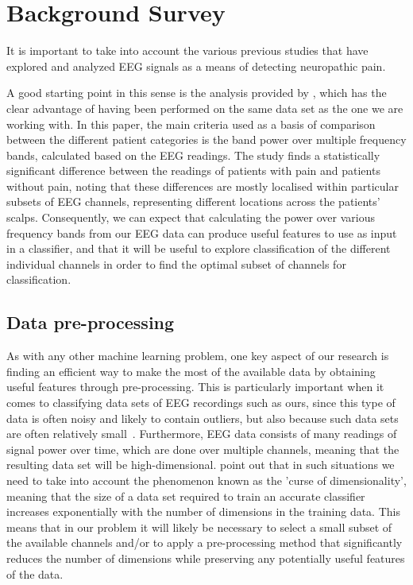 \documentclass{mprop}
\begin{document}
\section{Background Survey}

It is important to take into account the various previous studies that have explored and analyzed EEG signals as a means of detecting neuropathic pain.

A good starting point in this sense is the analysis provided by \citet{vuckovic_dynamic_2014}, which has the clear advantage of having been performed on the same data set as the one we are working with. In this paper, the main criteria used as a basis of comparison between the different patient categories is the band power over multiple frequency bands, calculated based on the EEG readings. The study finds a statistically significant difference between the readings of patients with pain and patients without pain, noting that these differences are mostly localised within particular subsets of EEG channels, representing different locations across the patients' scalps. Consequently, we can expect that calculating the power over various frequency bands from our EEG data can produce useful features to use as input in a classifier, and that it will be useful to explore classification of the different individual channels in order to find the optimal subset of channels for classification.

\subsection{Data pre-processing}
\label{data-prep}

As with any other machine learning problem, one key aspect of our research is finding an efficient way to make the most of the available data by obtaining useful features through pre-processing. This is particularly important when it comes to classifying data sets of EEG recordings such as ours, since this type of data is often noisy and likely to contain outliers, but also because such data sets are often relatively small~\cite{lotte_review_2007}. Furthermore, EEG data consists of many readings of signal power over time, which are done over multiple channels, meaning that the resulting data set will be high-dimensional. \citet{lotte_review_2007} point out that in such situations we need to take into account the phenomenon known as the 'curse of dimensionality', meaning that the size of a data set required to train an accurate classifier increases exponentially with the number of dimensions in the training data. This means that in our problem it will likely be necessary to select a small subset of the available channels and/or to apply a pre-processing method that significantly reduces the number of dimensions while preserving any potentially useful features of the data.
\end{document}
